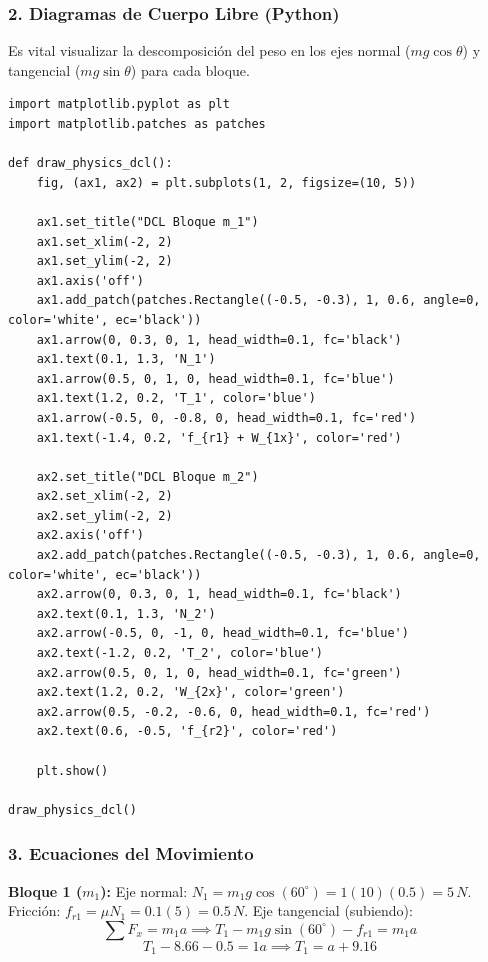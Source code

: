 \documentclass[12pt, a4paper]{article}
\begin{document}
\subsubsection*{2. Diagramas de Cuerpo Libre (Python)}
Es vital visualizar la descomposición del peso en los ejes normal ($mg\cos\theta$) y tangencial ($mg\sin\theta$) para cada bloque.

\begin{lstlisting}
import matplotlib.pyplot as plt
import matplotlib.patches as patches

def draw_physics_dcl():
    fig, (ax1, ax2) = plt.subplots(1, 2, figsize=(10, 5))
    
    ax1.set_title("DCL Bloque m_1")
    ax1.set_xlim(-2, 2)
    ax1.set_ylim(-2, 2)
    ax1.axis('off')
    ax1.add_patch(patches.Rectangle((-0.5, -0.3), 1, 0.6, angle=0, color='white', ec='black'))
    ax1.arrow(0, 0.3, 0, 1, head_width=0.1, fc='black')
    ax1.text(0.1, 1.3, 'N_1')
    ax1.arrow(0.5, 0, 1, 0, head_width=0.1, fc='blue')
    ax1.text(1.2, 0.2, 'T_1', color='blue')
    ax1.arrow(-0.5, 0, -0.8, 0, head_width=0.1, fc='red')
    ax1.text(-1.4, 0.2, 'f_{r1} + W_{1x}', color='red')
    
    ax2.set_title("DCL Bloque m_2")
    ax2.set_xlim(-2, 2)
    ax2.set_ylim(-2, 2)
    ax2.axis('off')
    ax2.add_patch(patches.Rectangle((-0.5, -0.3), 1, 0.6, angle=0, color='white', ec='black'))
    ax2.arrow(0, 0.3, 0, 1, head_width=0.1, fc='black')
    ax2.text(0.1, 1.3, 'N_2')
    ax2.arrow(-0.5, 0, -1, 0, head_width=0.1, fc='blue')
    ax2.text(-1.2, 0.2, 'T_2', color='blue')
    ax2.arrow(0.5, 0, 1, 0, head_width=0.1, fc='green')
    ax2.text(1.2, 0.2, 'W_{2x}', color='green')
    ax2.arrow(0.5, -0.2, -0.6, 0, head_width=0.1, fc='red')
    ax2.text(0.6, -0.5, 'f_{r2}', color='red')

    plt.show()

draw_physics_dcl()
\end{lstlisting}

\subsubsection*{3. Ecuaciones del Movimiento}

\textbf{Bloque 1 ($m_1$):}
Eje normal: $N_1 = m_1 g \cos(60^\circ) = 1(10)(0.5) = 5 \, \si{N}$.
Fricción: $f_{r1} = \mu N_1 = 0.1(5) = 0.5 \, \si{N}$.
Eje tangencial (subiendo):
$$\sum F_x = m_1 a \implies T_1 - m_1 g \sin(60^\circ) - f_{r1} = m_1 a$$
$$T_1 - 8.66 - 0.5 = 1a \implies T_1 = a + 9.16$$
\end{document}
